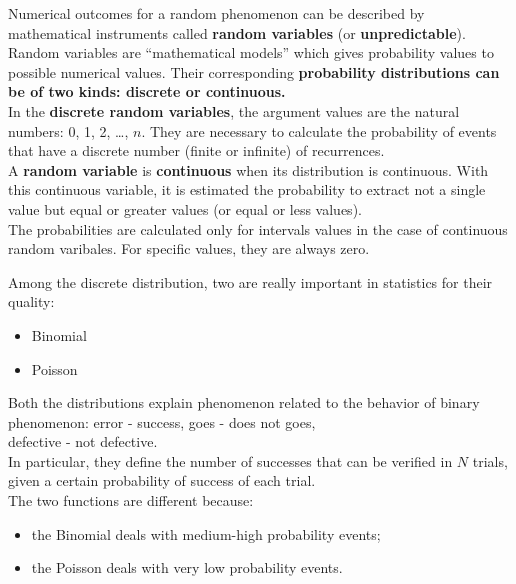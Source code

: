 \begin{frame}
  Numerical outcomes for a random phenomenon can be described by mathematical instruments called \textbf{random variables} (or \textbf{unpredictable}).\\
  \vspace*{.2cm}
  Random variables are ``mathematical models'' which gives probability values to possible numerical values. Their corresponding \textbf{probability distributions can be of two kinds: discrete or continuous.}\\
  \vspace*{.2cm}
  In the \textbf{discrete random variables}, the argument values are the natural numbers: 0, 1, 2, \dots, $ n $. They are necessary to calculate the probability of events that have a discrete number (finite or infinite) of recurrences.\\
  \vspace*{.2cm}
  A \textbf{random variable} is \textbf{continuous} when its distribution is continuous. With this continuous variable, it is estimated the probability to extract not a single value but equal or greater values (or equal or less values).\\
  The probabilities are calculated only for intervals values in the case of continuous random varibales. For specific values, they are always zero.
\end{frame}




\begin{frame}
  Among the discrete distribution, two are really important in statistics for their quality:\\
  \begin{itemize}
    \item Binomial
    \item Poisson
  \end{itemize}
  Both the distributions explain phenomenon related to the behavior of binary phenomenon: error - success, goes - does not goes, \\defective - not defective.\\
  \vspace*{.2cm}
  In particular, they define the number of successes that can be verified in $ N $ trials, given a certain probability of success of each trial.\\
  \vspace*{.2cm}
  The two functions are different because:
  \begin{itemize}
    \item the Binomial deals with medium-high probability events;
    \item the Poisson deals with very low probability events.
  \end{itemize}
\end{frame}

